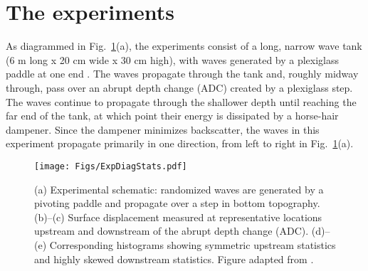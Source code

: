 \documentclass[11pt]{article}
\begin{document}
\section{The experiments}
\label{experiments}

	As diagrammed in Fig.~\ref{ExpDiagStats}(a), the experiments consist of a long, narrow wave tank (6 m long x 20 cm wide x 30 cm high), with waves generated by a plexiglass paddle at one end \cite{bolles2019}. The waves propagate through the tank and, roughly midway through, pass over an abrupt depth change (ADC) created by a plexiglass step. The waves continue to propagate through the shallower depth until reaching the far end of the tank, at which point their energy is dissipated by a horse-hair dampener. Since the dampener minimizes backscatter, the waves in this experiment propagate primarily in one direction, from left to right in Fig.~\ref{ExpDiagStats}(a). 

\begin{figure}%
\begin{center}
\texttt{[image: Figs/ExpDiagStats.pdf]}
\caption{
(a) Experimental schematic: randomized waves are generated by a pivoting paddle and propagate over a step in bottom topography.
(b)--(c) Surface displacement measured at representative locations upstream and downstream of the abrupt depth change (ADC). (d)--(e) Corresponding histograms showing symmetric upstream statistics and highly skewed downstream statistics. Figure adapted from \cite{bolles2019}.}
\label{ExpDiagStats}
\end{center}
\end{figure}
\end{document}
